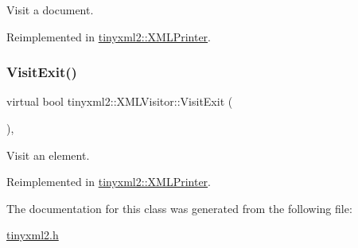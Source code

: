 Visit a document. 



Reimplemented in \hyperlink{classtinyxml2_1_1_x_m_l_printer_a15fc1f2b922f540917dcf52808737b29}{tinyxml2\+::\+X\+M\+L\+Printer}.

\mbox{\label{classtinyxml2_1_1_x_m_l_visitor_a772f10ddc83f881956d32628faa16eb6}} 
\subsubsection{\texorpdfstring{Visit\+Exit()}{VisitExit()}\hspace{0.1cm}{\footnotesize\ttfamily [2/2]}}
{\footnotesize\ttfamily virtual bool tinyxml2\+::\+X\+M\+L\+Visitor\+::\+Visit\+Exit (\begin{DoxyParamCaption}\item[{const \hyperlink{classtinyxml2_1_1_x_m_l_element}{X\+M\+L\+Element} \&}]{ }\end{DoxyParamCaption})\hspace{0.3cm}{\ttfamily [inline]}, {\ttfamily [virtual]}}



Visit an element. 



Reimplemented in \hyperlink{classtinyxml2_1_1_x_m_l_printer_a2edd48405971a88951c71c9df86a2f50}{tinyxml2\+::\+X\+M\+L\+Printer}.



The documentation for this class was generated from the following file\+:\begin{DoxyCompactItemize}
\item 
\hyperlink{tinyxml2_8h}{tinyxml2.\+h}\end{DoxyCompactItemize}
